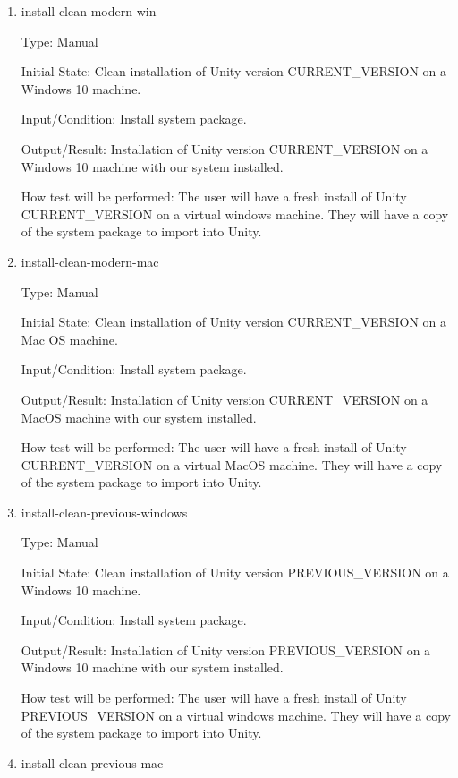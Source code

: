 \documentclass[12pt, titlepage]{article}
\begin{document}
\begin{enumerate}

\item{install-clean-modern-win\\}

Type: Manual
					
Initial State: Clean installation of Unity version CURRENT\_VERSION on a 
Windows 10 machine.
					
Input/Condition: Install system package.
					
Output/Result: Installation of Unity version CURRENT\_VERSION on a 
Windows 10 machine with our system installed.
					
How test will be performed: The user will have a fresh install of Unity 
CURRENT\_VERSION on a virtual windows machine. They will have a copy of the 
system package to import into Unity.

\item{install-clean-modern-mac\\}

Type: Manual

Initial State: Clean installation of Unity version CURRENT\_VERSION on a Mac OS 
machine.

Input/Condition: Install system package.

Output/Result: Installation of Unity version CURRENT\_VERSION on a 
MacOS machine with our system installed.

How test will be performed: The user will have a fresh install of Unity 
CURRENT\_VERSION on a virtual MacOS machine. They will have a copy of the 
system package to import into Unity.
					
\item{install-clean-previous-windows\\}

Type: Manual

Initial State: Clean installation of Unity version PREVIOUS\_VERSION on a 
Windows 10 machine.

Input/Condition: Install system package.

Output/Result: Installation of Unity version PREVIOUS\_VERSION on a 
Windows 10 machine with our system installed.

How test will be performed: The user will have a fresh install of Unity 
PREVIOUS\_VERSION on a virtual windows machine. They will have a copy of the 
system package to import into Unity.

\item{install-clean-previous-mac\\}


\end{enumerate}
\end{document}
